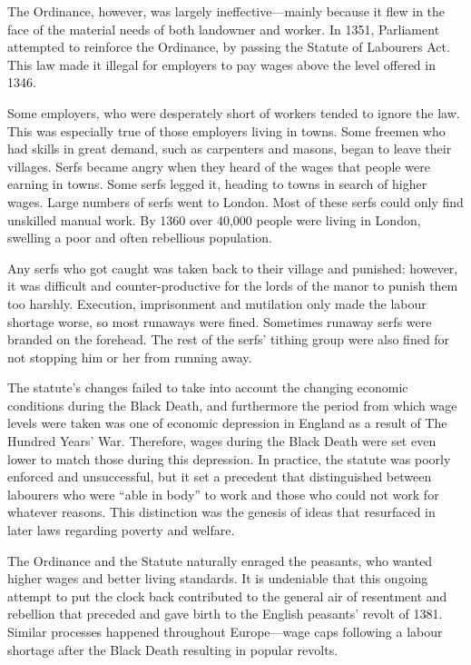 \documentclass[
  letterpaper,
  11pt,
  DIV=9,
  openright]{scrbook}
\begin{document}
The Ordinance, however, was largely ineffective---mainly because it flew
in the face of the material needs of both landowner and worker. In 1351,
Parliament attempted to reinforce the Ordinance, by passing the Statute
of Labourers Act. This law made it illegal for employers to pay wages
above the level offered in 1346.

Some employers, who were desperately short of workers tended to ignore
the law. This was especially true of those employers living in towns.
Some freemen who had skills in great demand, such as carpenters and
masons, began to leave their villages. Serfs became angry when they
heard of the wages that people were earning in towns. Some serfs legged
it, heading to towns in search of higher wages. Large numbers of serfs
went to London. Most of these serfs could only find unskilled manual
work. By 1360 over 40,000 people were living in London, swelling a poor
and often rebellious population.

Any serfs who got caught was taken back to their village and punished:
however, it was difficult and counter-productive for the lords of the
manor to punish them too harshly. Execution, imprisonment and mutilation
only made the labour shortage worse, so most runaways were fined.
Sometimes runaway serfs were branded on the forehead. The rest of the
serfs' tithing group were also fined for not stopping him or her from
running away.

The statute's changes failed to take into account the changing economic
conditions during the Black Death, and furthermore the period from which
wage levels were taken was one of economic depression in England as a
result of The Hundred Years' War. Therefore, wages during the Black
Death were set even lower to match those during this depression. In
practice, the statute was poorly enforced and unsuccessful, but it set a
precedent that distinguished between labourers who were ``able in body''
to work and those who could not work for whatever reasons. This
distinction was the genesis of ideas that resurfaced in later laws
regarding poverty and welfare.

The Ordinance and the Statute naturally enraged the peasants, who wanted
higher wages and better living standards. It is undeniable that this
ongoing attempt to put the clock back contributed to the general air of
resentment and rebellion that preceded and gave birth to the English
peasants' revolt of 1381. Similar processes happened throughout
Europe---wage caps following a labour shortage after the Black Death
resulting in popular revolts.
\end{document}
